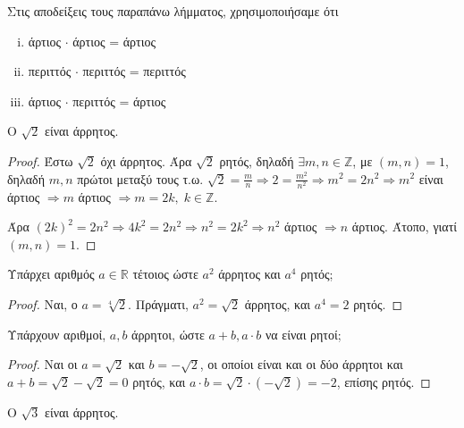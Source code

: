 \documentclass[main.tex]{subfiles}
\begin{document}
\begin{rem}
  Στις αποδείξεις τους παραπάνω λήμματος, χρησιμοποιήσαμε ότι 
  \begin{enumerate}[(i)]
    \item άρτιος $ \cdot $ άρτιος = άρτιος
    \item περιττός $ \cdot $ περιττός = περιττός
    \item άρτιος $ \cdot $ περιττός = άρτιος
  \end{enumerate}
\end{rem}

\begin{mythmbox}
Ο $ \sqrt{2} $ είναι άρρητος.
\end{mythmbox}

\begin{proof}
  Έστω $ \sqrt{2} $ όχι άρρητος. Άρα $ \sqrt{2} $ ρητός, δηλαδή $ \exists m,n 
  \in \mathbb{Z} $, με $ (m,n)=1 $, δηλαδή $ m,n $ πρώτοι μεταξύ τους
  τ.ω. $ \sqrt{2} = \frac{m}{n} \Rightarrow 2 = \frac{m^{2}}{n^{2}} \Rightarrow 
  m^{2} = 2n^{2} \Rightarrow m^{2}$ είναι άρτιος $ \Rightarrow m $ άρτιος 
  $ \Rightarrow m = 2k, \; k \in \mathbb{Z}$. 

  Άρα $ (2k)^{2} = 2n^{2} \Rightarrow 4k^{2}=2n^{2} \Rightarrow n^{2} = 2k^{2} 
  \Rightarrow n^{2} $ άρτιος $ \Rightarrow n $ άρτιος. Άτοπο, γιατί $ (m,n)=1 $.
\end{proof}

\begin{example}
  Υπάρχει αριθμός $ a \in \mathbb{R} $ τέτοιος ώστε $ a^{2} $ άρρητος και $ a^{4} $ 
  ρητός; 
\end{example}

\begin{proof}
  Ναι, ο $ a= \sqrt[4]{2} $. Πράγματι, $ a^{2} = \sqrt{2} $ άρρητος, και $ 
  a^{4} = 2$ ρητός.
\end{proof}

\begin{example}
  Υπάρχουν αριθμοί, $ a,b $ άρρητοι, ώστε $ a+b, a\cdot b $ να είναι ρητοί;
\end{example}

\begin{proof}
  Ναι οι $ a= \sqrt{2} $ και $ b= - \sqrt{2} $, οι οποίοι είναι και οι δύο άρρητοι 
  και $ a+b= \sqrt{2} - \sqrt{2} = 0 $ ρητός, και $ a\cdot b = \sqrt{2} \cdot (- 
  \sqrt{2}) = -2 $, επίσης ρητός.
\end{proof}

\begin{example}
  Ο $ \sqrt{3} $ είναι άρρητος.
\end{example}
\end{document}

